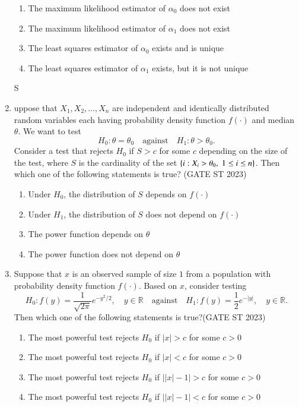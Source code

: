 \documentclass[journal]{IEEEtran}
\begin{document}
\begin{enumerate}[label=\textbf{Q.\arabic*.}, start=11, align=left, itemsep=2em]
\begin{enumerate}
    \item The maximum likelihood estimator of $\alpha_0$ does not exist
    \item The maximum likelihood estimator of $\alpha_1$ does not exist
    \item The least squares estimator of $\alpha_0$ exists and is unique
    \item The least squares estimator of $\alpha_1$ exists, but it is not unique
\end{enumerate}


S\item uppose that $X_1, X_2, \dots, X_n$ are independent and identically distributed random 
variables each having probability density function $f(\cdot)$ and median $\theta$.  
We want to test
\[
H_0: \theta = \theta_0 \quad \text{against} \quad H_1: \theta > \theta_0.
\]
Consider a test that rejects $H_0$ if $S > c$ for some $c$ depending on the size of 
the test, where $S$ is the cardinality of the set $\left\{i : X_i > \theta_0, \; 1 \le i \le n \right\}$.  
Then which one of the following statements is true? \hfill(GATE ST 2023) 

\begin{enumerate}
    \item Under $H_0$, the distribution of $S$ depends on $f(\cdot)$
    \item Under $H_1$, the distribution of $S$ does not depend on $f(\cdot)$
    \item The power function depends on $\theta$
    \item The power function does not depend on $\theta$
\end{enumerate}

\item Suppose that $x$ is an observed sample of size $1$ from a population with 
probability density function $f(\cdot)$. Based on $x$, consider testing 
\[
H_0: f(y) = \frac{1}{\sqrt{2\pi}} e^{-y^2/2}, \quad y \in \mathbb{R} 
\quad \text{against} \quad 
H_1: f(y) = \frac12 e^{-|y|}, \quad y \in \mathbb{R}.
\]
Then which one of the following statements is true?\hfill(GATE ST 2023)  

\begin{enumerate}
    \item The most powerful test rejects $H_0$ if $|x| > c$ for some $c>0$
    \item The most powerful test rejects $H_0$ if $|x| < c$ for some $c>0$
    \item The most powerful test rejects $H_0$ if $\big||x| - 1\big| > c$ for some $c>0$
    \item The most powerful test rejects $H_0$ if $\big||x| - 1\big| < c$ for some $c>0$
\end{enumerate}



\end{enumerate}
\end{document}
